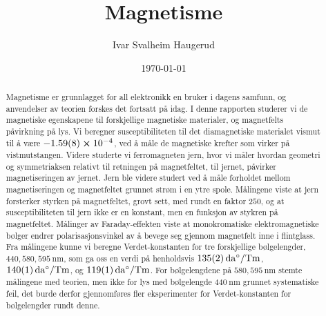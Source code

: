 \documentclass[%
 reprint,
 amsmath,amssymb,
 aps,
 norsk,
]{revtex4-1}
\begin{document}

\title{Magnetisme}%

\author{Ivar Svalheim Haugerud}

%

\date{\today}%

\begin{abstract}
Magnetisme er grunnlagget for all elektronikk en bruker i dagens samfunn, og anvendelser av teorien forskes det fortsatt på idag. I denne rapporten studerer vi de magnetiske egenskapene til forskjellige magnetiske materialer, og magnetfelts påvirkning på lys. Vi beregner susceptibiliteten til det diamagnetiske materialet vismut til å være $-1.59(8)\cross 10^{-4}$, ved å måle de magnetiske krefter som virker på vistmutstangen.
Videre studerte vi ferromagneten jern, hvor vi måler hvordan geometri og symmetriaksen relativt til retningen på magnetfeltet, til jernet, påvirker magnetiseringen av jernet. Jern ble videre studert ved å måle forholdet mellom magnetiseringen og magnetfeltet grunnet strøm i en ytre spole. Målingene viste at jern forsterker styrken på magnetfeltet, grovt sett, med rundt en faktor $250$, og at susceptibiliteten til jern ikke er en konstant, men en funksjon av stykren på magnetfeltet. Målinger av Faraday-effekten viste at monokromatiske elektromagnetiske bølger endrer polarisasjonsvinkel av å bevege seg gjennom magnetfelt inne i flintglass. Fra målingene kunne vi beregne Verdet-konstanten for tre forskjellige bølgelengder, $440, 580, \SI{595}{\nano\meter}$, som ga oss en verdi på henholdsvis $\SI{135\pm2}{\deca\degree/\tesla\meter}$, $\SI{140\pm1}{\deca\degree/\tesla\meter}$, og $\SI{119\pm1}{\deca\degree/\tesla\meter}$.
For bølgelengdene på $580, \SI{595}{\nano\meter}$ stemte målingene med teorien, men ikke for lys med bølgelengde $\SI{440}{\nano\meter}$ grunnet systematiske feil, det burde derfor gjennomføres fler eksperimenter for Verdet-konstanten for bølgelengder rundt denne.
\end{abstract}

\maketitle
\end{document}
